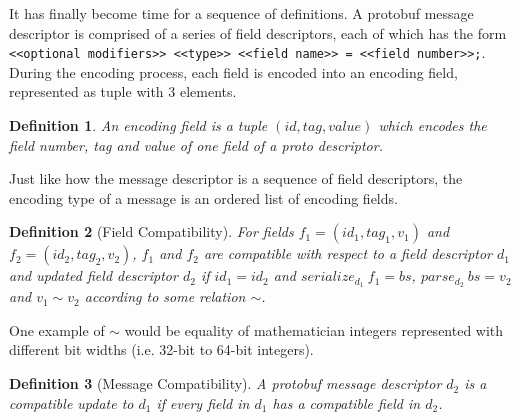 \documentclass[11pt]{article}
\newtheorem{definition}{Definition}
\begin{document}
It has finally become time for a sequence of definitions. A protobuf message
descriptor is comprised of a series of field descriptors, each of which has the
form \texttt{<<optional modifiers>> <<type>> <<field name>> = <<field
	number>>;}. During the encoding process, each field is encoded into an
encoding field, represented as tuple with 3 elements.

\begin{definition}
	An encoding field is a tuple $(id, tag, value)$ which encodes the field
	number, tag and value of one field of a proto descriptor.
\end{definition}

Just like how the message descriptor is a sequence of field descriptors, the
encoding type of a message is an ordered list of encoding fields.

\begin{definition}[Field Compatibility]
	For fields $f_1 = (id_1, tag_1, v_1)$ and $f_2 = (id_2, tag_2, v_2)$, $f_1$
	and $f_2$ are compatible with respect to a field descriptor $d_1$ and updated
	field descriptor $d_2$ if $id_1 = id_2$ and $serialize_{d_1}\ f_1 = bs$,
	$parse_{d_2}\ bs = v_2$ and $v_1 \sim v_2$ according to some relation $\sim$.
\end{definition}

One example of $\sim$ would be equality of mathematician integers represented with
different bit widths (i.e. 32-bit to 64-bit integers).

\begin{definition}[Message Compatibility]
	A protobuf message descriptor $d_2$ is a compatible update to $d_1$ if every
	field in $d_1$ has a compatible field in $d_2$.
\end{definition}

\printbibliography{}
\end{document}
